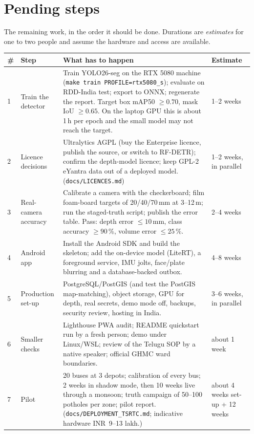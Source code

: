 \documentclass[11pt,a4paper]{article}
\newcommand{\code}[1]{\texttt{\small #1}}
\newcommand{\INR}{INR~}
\begin{document}
\section{Pending steps}\label{sec:pending}

The remaining work, in the order it should be done. Durations are \emph{estimates} for one to two people and
assume the hardware and access are available.

\begin{longtable}{@{}p{} p{} p{} p{}@{}}
\toprule
\# & \textbf{Step} & \textbf{What has to happen} & \textbf{Estimate}\\
\midrule
\endhead
1 & Train the detector & Train YOLO26-seg on the RTX 5080 machine (\code{make train PROFILE=rtx5080\_s}); evaluate on
RDD-India test; export to ONNX; regenerate the report. Target box mAP50 $\ge0.70$, mask IoU $\ge0.65$. On the laptop
GPU this is about 1\,h per epoch and the small model may not reach the target. & 1--2 weeks\\
2 & Licence decisions & Ultralytics AGPL (buy the Enterprise licence, publish the source, or switch to RF-DETR);
confirm the depth-model licence; keep GPL-2 eYantra data out of a deployed model. (\code{docs/LICENCES.md}) & 1--2 weeks,
in parallel\\
3 & Real-camera accuracy & Calibrate a camera with the checkerboard; film foam-board targets of 20/40/70\,mm at
3--12\,m; run the staged-truth script; publish the error table. Pass: depth error $\le10$\,mm, class accuracy
$\ge90$\,\%, volume error $\le25$\,\%. & 2--4 weeks\\
4 & Android app & Install the Android SDK and build the skeleton; add the on-device model (LiteRT), a foreground
service, IMU jolts, face/plate blurring and a database-backed outbox. & 4--8 weeks\\
5 & Production set-up & PostgreSQL/PostGIS (and test the PostGIS map-matching), object storage, GPU for depth,
real secrets, demo mode off, backups, security review, hosting in India. & 3--6 weeks, in parallel\\
6 & Smaller checks & Lighthouse PWA audit; README quickstart run by a fresh person; demo under Linux/WSL; review
of the Telugu SOP by a native speaker; official GHMC ward boundaries. & about 1 week\\
7 & Pilot & 20 buses at 3 depots; calibration of every bus; 2 weeks in shadow mode, then 10 weeks live through a
monsoon; truth campaign of 50--100 potholes per zone; pilot report. (\code{docs/DEPLOYMENT\_TSRTC.md}; indicative
hardware \INR9--13 lakh.) & about 4 weeks set-up + 12 weeks\\
\bottomrule
\end{longtable}
\end{document}
